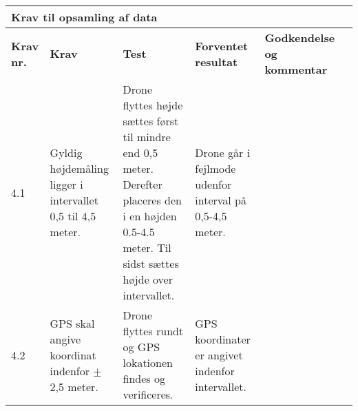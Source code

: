 \begin{sideways}
    \centering
    \begin{tabular}{|l|p{4.5 cm}|p{4.5 cm}|p{4.5 cm}|p{4.5 cm}|p{2 cm}|}
			\hline
			\multicolumn{5}{|l|}{\textbf{Krav til opsamling af data}}\\ \hline
			\textbf{Krav nr.} & \textbf{Krav} & \textbf{Test} & \textbf{Forventet \newline resultat} & 			
			\textbf{Godkendelse \newline og kommentar} \\ \hline
			
			4.1 & Gyldig højdemåling ligger i intervallet 0,5 til 4,5 meter.
				& Drone flyttes højde sættes først til mindre end 0,5 meter. Derefter placeres den i en højden 0.5-4.5 meter. Til sidst sættes højde over intervallet. 
				& Drone går i fejlmode udenfor interval på 0,5-4,5 meter.
				& \\ \hline

			4.2 & GPS skal angive koordinat indenfor $\pm$ 2,5 meter. 
				& Drone flyttes rundt og GPS lokationen findes og verificeres.
				& GPS koordinater er angivet indenfor intervallet. 
				&  \\ \hline		
		\end{tabular}
	\label{tab:krav_1}
\end{sideways}